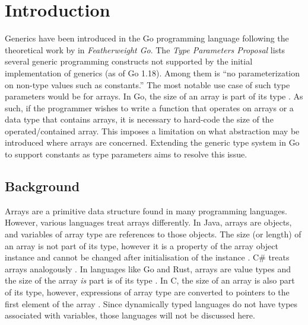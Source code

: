\section{Introduction}

Generics have been introduced in the Go programming language following the
theoretical work by \cite{fg} in \emph{Featherweight Go}. The \emph{Type
      Parameters Proposal} lists several generic programming constructs not supported
by the initial implementation of generics (as of Go 1.18). Among them is ``no
parameterization on non-type values such as constants.''
\autocite{genericsProposal} The most notable use case of such type parameters
would be for arrays. In Go, the size of an array is part of its type
\autocite{spec}. As such, if the programmer wishes to write a function that
operates on arrays or a data type that contains arrays, it is necessary to
hard-code the size of the operated/contained array. This imposes a limitation on
what abstraction may be introduced where arrays are concerned. Extending the
generic type system in Go to support constants as type parameters aims to
resolve this issue.

\subsection{Background}

Arrays are a primitive data structure found in many programming languages.
However, various languages treat arrays differently. In Java, arrays are
objects, and variables of array type are references to those objects. The size
(or length) of an array is not part of its type, however it is a property of the
array object instance and cannot be changed after initialisation of the instance
\autocite{javaSpec}. C\# treats arrays analogously \autocite{cSharpArrays}. In
languages like Go and Rust, arrays are value types and the size of the array
\emph{is} part is of its type \autocites{spec}{rustSpec}. In C, the size of an
array is also part of its type, however, expressions of array type are converted
to pointers to the first element of the array \autocite{cSpec}. Since
dynamically typed languages do not have types associated with variables, those
languages will not be discussed here.




